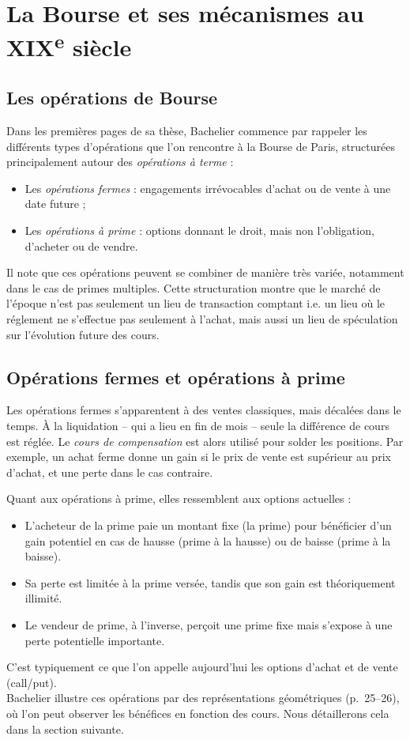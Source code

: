\documentclass[12pt,a4paper]{article}
\begin{document}
\section{La Bourse et ses mécanismes au XIX\textsuperscript{e} siècle}

\subsection{Les opérations de Bourse}

Dans les premières pages de sa thèse, Bachelier commence par rappeler les différents types d'opérations que l’on rencontre à la Bourse de Paris, structurées principalement autour des \textit{opérations à terme} :

\begin{itemize}
  \item Les \textit{opérations fermes} : engagements irrévocables d'achat ou de vente à une date future ;
  \item Les \textit{opérations à prime} : options donnant le droit, mais non l'obligation, d’acheter ou de vendre.
\end{itemize}

Il note que ces opérations peuvent se combiner de manière très variée, notamment dans le cas de primes multiples. Cette structuration montre que le marché de l’époque n’est pas seulement un lieu de transaction comptant i.e. un lieu où le réglement ne s'effectue pas seulement à l'achat, mais aussi un lieu de spéculation sur l’évolution future des cours.

\subsection{Opérations fermes et opérations à prime}

Les opérations fermes s’apparentent à des ventes classiques, mais décalées dans le temps. À la liquidation -- qui a lieu en fin de mois -- seule la différence de cours est réglée. Le \textit{cours de compensation} est alors utilisé pour solder les positions. Par exemple, un achat ferme donne un gain si le prix de vente est supérieur au prix d’achat, et une perte dans le cas contraire.

Quant aux opérations à prime, elles ressemblent aux options actuelles :
\begin{itemize}
  \item L’acheteur de la prime paie un montant fixe (la prime) pour bénéficier d’un gain potentiel en cas de hausse (prime à la hausse) ou de baisse (prime à la baisse).
  \item Sa perte est limitée à la prime versée, tandis que son gain est théoriquement illimité.
  \item Le vendeur de prime, à l’inverse, perçoit une prime fixe mais s’expose à une perte potentielle importante.
\end{itemize}
C'est typiquement ce que l'on appelle aujourd'hui les options d'achat et de vente (call/put).\\
Bachelier illustre ces opérations par des représentations géométriques (p.~25–26), où l'on peut observer les bénéfices en fonction des cours. Nous détaillerons cela dans la section suivante.
\end{document}
